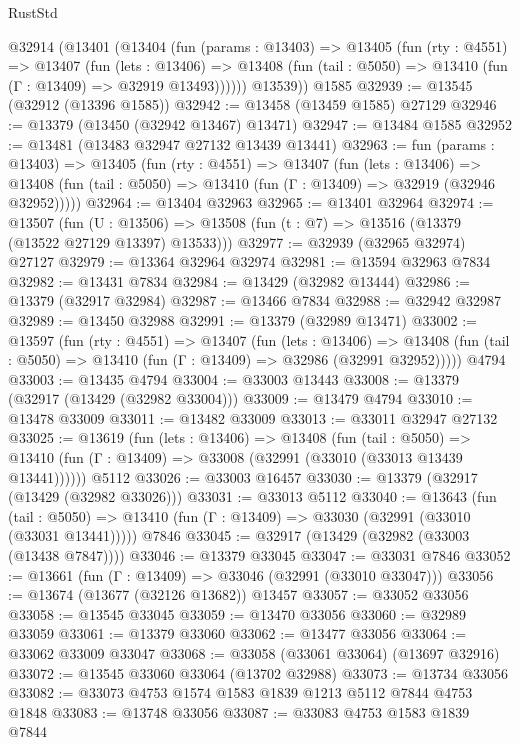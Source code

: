\begin{lexlean}{RustStd}
\begin{coremodule}
    @32914
      (@13401
        (@13404
          (fun (params : @13403) =>
          @13405
            (fun (rty : @4551) =>
            @13407
              (fun (lets : @13406) =>
              @13408 (fun (tail : @5050) => @13410 (fun (Γ : @13409) => @32919 @13493))))))
        @13539))
    @1585
@32939 := @13545 (@32912 (@13396 @1585))
@32942 := @13458 (@13459 @1585) @27129
@32946 := @13379 (@13450 (@32942 @13467) @13471)
@32947 := @13484 @1585
@32952 := @13481 (@13483 @32947 @27132 @13439 @13441)
@32963 := fun (params : @13403) =>
  @13405
    (fun (rty : @4551) =>
    @13407
      (fun (lets : @13406) =>
      @13408 (fun (tail : @5050) => @13410 (fun (Γ : @13409) => @32919 (@32946 @32952)))))
@32964 := @13404 @32963
@32965 := @13401 @32964
@32974 := @13507
    (fun (U : @13506) => @13508 (fun (t : @7) => @13516 (@13379 (@13522 @27129 @13397) @13533)))
@32977 := @32939 (@32965 @32974) @27127
@32979 := @13364 @32964 @32974
@32981 := @13594 @32963 @7834
@32982 := @13431 @7834
@32984 := @13429 (@32982 @13444)
@32986 := @13379 (@32917 @32984)
@32987 := @13466 @7834
@32988 := @32942 @32987
@32989 := @13450 @32988
@32991 := @13379 (@32989 @13471)
@33002 := @13597
    (fun (rty : @4551) =>
    @13407
      (fun (lets : @13406) =>
      @13408 (fun (tail : @5050) => @13410 (fun (Γ : @13409) => @32986 (@32991 @32952)))))
    @4794
@33003 := @13435 @4794
@33004 := @33003 @13443
@33008 := @13379 (@32917 (@13429 (@32982 @33004)))
@33009 := @13479 @4794
@33010 := @13478 @33009
@33011 := @13482 @33009
@33013 := @33011 @32947 @27132
@33025 := @13619
    (fun (lets : @13406) =>
    @13408
      (fun (tail : @5050) =>
      @13410 (fun (Γ : @13409) => @33008 (@32991 (@33010 (@33013 @13439 @13441))))))
    @5112
@33026 := @33003 @16457
@33030 := @13379 (@32917 (@13429 (@32982 @33026)))
@33031 := @33013 @5112
@33040 := @13643
    (fun (tail : @5050) => @13410 (fun (Γ : @13409) => @33030 (@32991 (@33010 (@33031 @13441)))))
    @7846
@33045 := @32917 (@13429 (@32982 (@33003 (@13438 @7847))))
@33046 := @13379 @33045
@33047 := @33031 @7846
@33052 := @13661 (fun (Γ : @13409) => @33046 (@32991 (@33010 @33047)))
@33056 := @13674 (@13677 (@32126 @13682)) @13457
@33057 := @33052 @33056
@33058 := @13545 @33045
@33059 := @13470 @33056
@33060 := @32989 @33059
@33061 := @13379 @33060
@33062 := @13477 @33056
@33064 := @33062 @33009 @33047
@33068 := @33058 (@33061 @33064) (@13697 @32916)
@33072 := @13545 @33060 @33064 (@13702 @32988)
@33073 := @13734 @33056
@33082 := @33073 @4753 @1574 @1583 @1839 @1213 @5112 @7844 @4753 @1848
@33083 := @13748 @33056
@33087 := @33083 @4753 @1583 @1839 @7844

\end{coremodule}
\end{lexlean}
